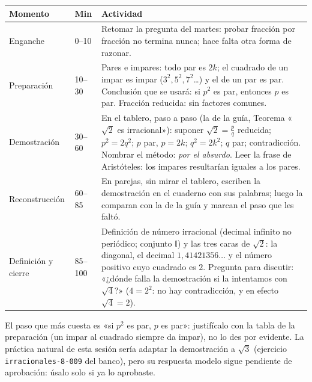 \documentclass[11pt]{article}
\begin{document}
\begin{center}
{\renewcommand{\arraystretch}{1.3}
\begin{tabularx}{\linewidth}{@{}l l X@{}}
  \toprule
  \textbf{Momento} & \textbf{Min} & \textbf{Actividad}\\
  \midrule
  Enganche & 0–10 & Retomar la pregunta del martes: probar fracción por fracción no
    termina nunca; hace falta otra forma de razonar.\\
  Preparación & 10–30 & Pares e impares: todo par es $2k$; el cuadrado de un impar es impar
    ($3^2, 5^2, 7^2$…) y el de un par es par. Conclusión que se usará: si $p^2$ es par,
    entonces $p$ es par. Fracción reducida: sin factores comunes.\\
  Demostración & 30–60 & En el tablero, paso a paso (la de la guía, Teorema «$\sqrt{2}$ es
    irracional»): suponer $\sqrt{2} = \frac{p}{q}$ reducida; $p^2 = 2q^2$; $p$ par, $p = 2k$;
    $q^2 = 2k^2$; $q$ par; contradicción. Nombrar el método: \emph{por el absurdo}. Leer la
    frase de Aristóteles: los impares resultarían iguales a los pares.\\
  Reconstrucción & 60–85 & En parejas, sin mirar el tablero, escriben la demostración en el
    cuaderno con sus palabras; luego la comparan con la de la guía y marcan el paso que les
    faltó.\\
  Definición y cierre & 85–100 & Definición de número irracional (decimal infinito no
    periódico; conjunto $\mathbb{I}$) y las tres caras de $\sqrt{2}$: la diagonal, el decimal
    $1{,}41421356\ldots$ y el número positivo cuyo cuadrado es $2$. Pregunta para discutir:
    «¿dónde falla la demostración si la intentamos con $\sqrt{4}$?» ($4 = 2^2$: no hay
    contradicción, y en efecto $\sqrt{4} = 2$).\\
  \bottomrule
\end{tabularx}}
\end{center}

\begin{nota}
El paso que más cuesta es «si $p^2$ es par, $p$ es par»: justifícalo con la tabla de la
preparación (un impar al cuadrado siempre da impar), no lo des por evidente. La práctica natural
de esta sesión sería adaptar la demostración a $\sqrt{3}$ (ejercicio \texttt{irracionales-8-009}
del banco), pero su respuesta modelo sigue pendiente de aprobación: úsalo solo si ya lo
aprobaste.
\end{nota}

\end{document}
